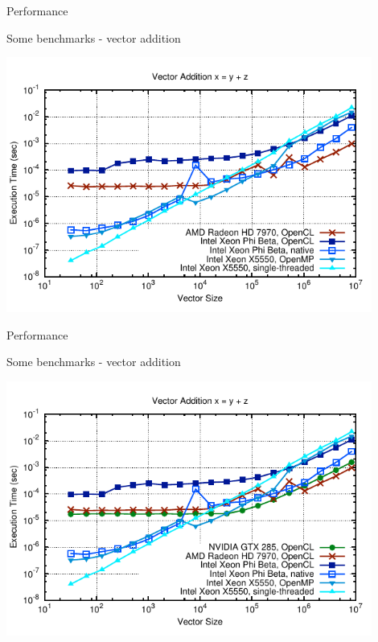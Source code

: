 \begin{frame}{Performance}
\begin{block}{Some benchmarks - vector addition}
  \begin{center}
   \includegraphics[width=0.9\textwidth]{figs/vector-timings-5}
  \end{center}
\end{block}
\end{frame}

\begin{frame}{Performance}
\begin{block}{Some benchmarks - vector addition}
  \begin{center}
   \includegraphics[width=0.9\textwidth]{figs/vector-timings-6}
  \end{center}
\end{block}
\end{frame}

